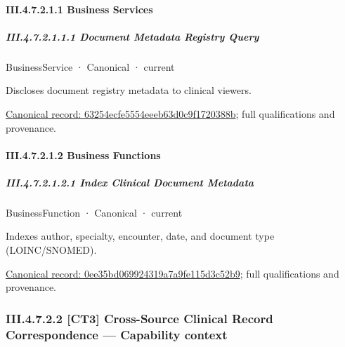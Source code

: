 \paragraph*{III.4.7.2.1.1 Business Services}
\label{navigation:III.4.7.2.1.1}

\subparagraph*{III.4.7.2.1.1.1 Document Metadata Registry Query}
\label{navigation:III.4.7.2.1.1.1}

\label{element:63254ecfe5554eeeb63d0c9f1720388b}
{\small BusinessService · Canonical · current}\par

Discloses document registry metadata to clinical viewers.


{\footnotesize \href{../../../../../../../continuum/business/business-service/63254ecfe5554eeeb63d0c9f1720388b.md}{Canonical record: 63254ecfe5554eeeb63d0c9f1720388b}; full qualifications and provenance.}\par
\paragraph*{III.4.7.2.1.2 Business Functions}
\label{navigation:III.4.7.2.1.2}

\subparagraph*{III.4.7.2.1.2.1 Index Clinical Document Metadata}
\label{navigation:III.4.7.2.1.2.1}

\label{element:0ee35bd069924319a7a9fe115d3c52b9}
{\small BusinessFunction · Canonical · current}\par

Indexes author, specialty, encounter, date, and document type (LOINC/SNOMED).


{\footnotesize \href{../../../../../../../continuum/business/business-function/0ee35bd069924319a7a9fe115d3c52b9.md}{Canonical record: 0ee35bd069924319a7a9fe115d3c52b9}; full qualifications and provenance.}\par
\subsubsection*{III.4.7.2.2 [CT3] Cross-Source Clinical Record Correspondence — Capability context}
\label{navigation:III.4.7.2.2}

